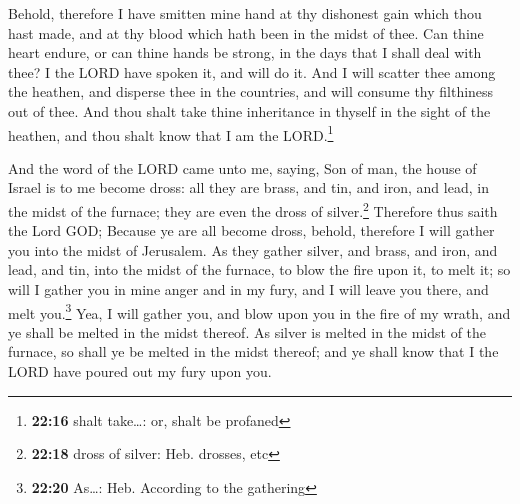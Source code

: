  Behold, therefore I have smitten mine hand at thy
dishonest gain which thou hast made, and at thy blood which hath been in
the midst of thee.  Can thine heart endure, or can thine
hands be strong, in the days that I shall deal with thee? I the LORD
have spoken it, and will do it.  And I will scatter thee
among the heathen, and disperse thee in the countries, and will consume
thy filthiness out of thee.  And thou shalt take thine
inheritance in thyself in the sight of the heathen, and thou shalt know
that I am the LORD.\footnote{\textbf{22:16} shalt take\ldots: or, shalt
  be profaned}

 And the word of the LORD came unto me, saying,
 Son of man, the house of Israel is to me become dross:
all they are brass, and tin, and iron, and lead, in the midst of the
furnace; they are even the dross of silver.\footnote{\textbf{22:18}
  dross of silver: Heb. drosses, etc}  Therefore thus
saith the Lord GOD; Because ye are all become dross, behold, therefore I
will gather you into the midst of Jerusalem.  As they
gather silver, and brass, and iron, and lead, and tin, into the midst of
the furnace, to blow the fire upon it, to melt it; so will I gather you
in mine anger and in my fury, and I will leave you there, and melt
you.\footnote{\textbf{22:20} As\ldots: Heb. According to the gathering}
 Yea, I will gather you, and blow upon you in the fire of
my wrath, and ye shall be melted in the midst thereof. 
As silver is melted in the midst of the furnace, so shall ye be melted
in the midst thereof; and ye shall know that I the LORD have poured out
my fury upon you.

